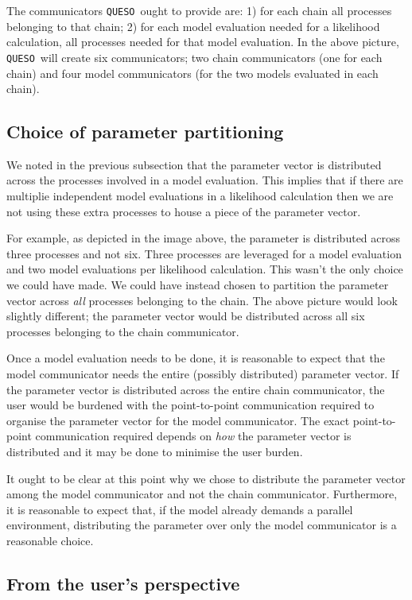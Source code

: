\documentclass{article}
\newcommand{\Queso}{\texttt{QUESO}}
\begin{document}
The communicators \Queso\ ought to provide are: 1) for each chain all processes
belonging to that chain; 2) for each model evaluation needed for a likelihood
calculation, all processes needed for that model evaluation.  In the above
picture, \Queso\ will create six communicators; two chain communicators (one
for each chain) and four model communicators (for the two models evaluated
in each chain).

\subsection{Choice of parameter partitioning}

We noted in the previous subsection that the parameter vector is distributed
across the processes involved in a model evaluation.  This implies that if
there are multiplie independent model evaluations in a likelihood calculation
then we are not using these extra processes to house a piece of the parameter
vector.

For example, as depicted in the image above, the parameter is distributed
across three processes and not six.  Three processes are leveraged for a model
evaluation and two model evaluations per likelihood calculation.  This wasn't
the only choice we could have made.  We could have instead chosen to partition
the parameter vector across \emph{all} processes belonging to the chain.  The
above picture would look slightly different; the parameter vector would be
distributed across all six processes belonging to the chain communicator.

Once a model evaluation needs to be done, it is reasonable to expect that the
model communicator needs the entire (possibly distributed) parameter vector.
If the parameter vector is distributed across the entire chain communicator,
the user would be burdened with the point-to-point communication required to
organise the parameter vector for the model communicator.  The exact
point-to-point communication required depends on \emph{how} the parameter
vector is distributed and it may be done to minimise the user burden.

It ought to be clear at this point why we chose to distribute the parameter
vector among the model communicator and not the chain communicator.
Furthermore, it is reasonable to expect that, if the model already demands a
parallel environment, distributing the parameter over only the model
communicator is a reasonable choice.

\subsection{From the user's perspective}
\end{document}
